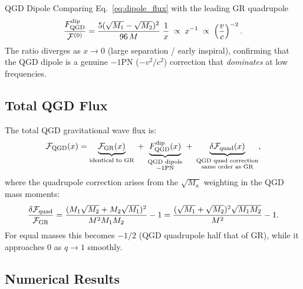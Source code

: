 \documentclass[11pt,a4paper]{article}
\newcommand{\Fp}{F_{\rm QGD}^{\rm dip}}
\theoremstyle{definition}
\theoremstyle{remark}
\begin{document}
	QGD Dipole
		Comparing Eq.~\eqref{eq:dipole_flux} with the leading GR quadrupole
		\begin{equation}
			\frac{\Fp}{\mathcal{F}^{(0)}}
			= \frac{5(\sqrt{M_1}-\sqrt{M_2})^2}{96\,M}\;\frac{1}{x}
			\;\propto\; x^{-1}
			\;\propto\; \left(\frac{v}{c}\right)^{-2}.
			\label{eq:dipole_ratio}
		\end{equation}
		The ratio diverges as $x\to0$ (large separation / early inspiral),
		confirming that the QGD dipole is a genuine $-1$PN ($-v^2/c^2$)
		correction that \emph{dominates} at low frequencies.
	
	\subsection{Total QGD Flux}
	
	The total QGD gravitational wave flux is:
	\begin{equation}
		\mathcal{F}_{\rm QGD}(x)
		= \underbrace{\mathcal{F}_{\rm GR}(x)}_{\text{identical to GR}}
		\;+\;
		\underbrace{\Fp(x)}_{\substack{\text{QGD dipole}\\\text{$-1$PN}}}
		\;+\;
		\underbrace{\delta\mathcal{F}_{\rm quad}(x)}_{\substack{\text{QGD quad correction}\\\text{same order as GR}}},
		\label{eq:qgd_flux_total}
	\end{equation}
	where the quadrupole correction arises from the $\sqrt{M_a}$
	weighting in the QGD mass moments:
	\begin{equation}
		\frac{\delta\mathcal{F}_{\rm quad}}{\mathcal{F}_{\rm GR}}
		= \frac{(M_1\sqrt{M_2}+M_2\sqrt{M_1})^2}{M^2 M_1 M_2} - 1
		= \frac{(\sqrt{M_1}+\sqrt{M_2})^2\sqrt{M_1 M_2}}{M^2}-1.
		\label{eq:quad_correction}
	\end{equation}
	For equal masses this becomes $-1/2$ (QGD quadrupole half that of GR),
	while it approaches $0$ as $q\to1$ smoothly.
	
	\subsection{Numerical Results}
	
\end{document}
